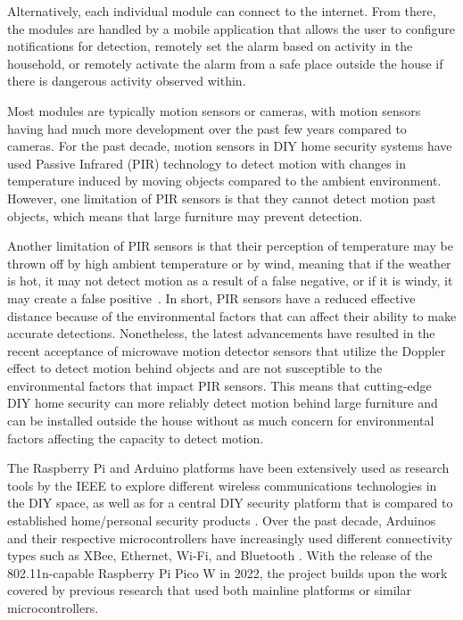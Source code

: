 Alternatively, each individual module can connect to the internet. \cite{sarhan2020} From
there, the modules are handled by a mobile application that allows the user to configure
notifications for detection, remotely set the alarm based on activity in the household, or
remotely activate the alarm from a safe place outside the house if there is dangerous
activity observed within. \cite{joseMalekian2017}

Most modules are typically motion sensors or cameras, with motion sensors having had
much more development over the past few years compared to cameras. For the past decade,
motion sensors in DIY home security systems have used Passive Infrared (PIR) technology to
detect motion with changes in temperature induced by moving objects compared to the ambient
environment. \cite{sarhan2020} However, one limitation of PIR sensors is that they cannot
detect motion past objects, which means that large furniture may prevent detection.

Another limitation of PIR sensors is that their perception of temperature may be thrown off
by high ambient temperature or by wind, meaning that if the weather is hot, it may not detect
motion as a result of a false negative, or if it is windy, it may create a false
positive~\cite{sarhan2020}. In short, PIR sensors have a reduced effective distance because
of the environmental factors that can affect their ability to make accurate detections.
Nonetheless, the latest advancements have resulted in the recent acceptance of microwave
motion detector sensors that utilize the Doppler effect to detect motion behind objects
and are not susceptible to the environmental factors that impact PIR sensors\cite{sarhan2020}. This means that cutting-edge DIY home security can more reliably detect motion
behind large furniture and can be installed outside the house without as much concern for
environmental factors affecting the capacity to detect motion.

The Raspberry Pi and Arduino platforms have been extensively used as research tools by the
IEEE to explore different wireless communications technologies in the DIY space, as well as
for a central DIY security platform that is compared to established home/personal security
products \cite{sarhan2020}. Over the past decade, Arduinos and their respective
microcontrollers have increasingly used different connectivity types such as XBee, Ethernet,
Wi-Fi, and Bluetooth \cite{sarhan2020}. With the release of the 802.11n-capable Raspberry
Pi Pico W in 2022, the project builds upon the work covered by previous research that used
both mainline platforms or similar microcontrollers.